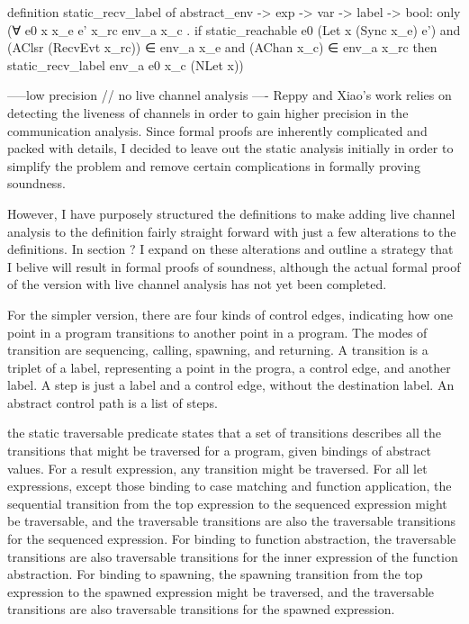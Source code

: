 definition static_recv_label of abstract_env -> exp -> var -> label -> bool:
only
(∀ e0 x x_e e' x_rc env_a x_c .
  if
    static_reachable e0 (Let x (Sync x_e) e') and
    (AClsr (RecvEvt x_rc)) ∈ env_a x_e and 
    (AChan x_c) ∈ env_a x_rc 
  then
    static_recv_label env_a e0 x_c (NLet x))


-----low precision // no live channel analysis ----
Reppy and Xiao's work relies on detecting the liveness of channels in order to gain higher
precision in the communication analysis.  Since formal proofs are inherently complicated and
packed with details, I decided to leave out the static analysis initially in order to simplify the
problem and remove certain complications in formally proving soundness.

However, I have purposely
structured the definitions to make adding live channel analysis to the definition fairly  
straight forward with just a few alterations to the definitions.  In section ? I expand on
these alterations and outline a strategy that I belive will result in formal proofs of soundness,
although the actual formal proof of the version with live channel analysis has not yet been
completed.  

For the simpler version, there are four kinds of control edges, indicating how one point in a
program transitions to another point in a program.  The modes of transition are sequencing,
calling, spawning, and returning. A transition is a triplet of a label, representing a point in
the progra, a control edge, and another label.  A step is just a label and a control edge,
without the destination label.  An abstract control path is a list of steps.  

the static traversable predicate states that a set of transitions describes all the transitions
that might be traversed for a program, given bindings of abstract values.  For a result
expression, any transition might be traversed.  For all let expressions, except those binding
to case matching and function application, the sequential transition from the top expression to
the sequenced expression might be traversable, and the traversable transitions are also the
traversable transitions for the sequenced expression.  For binding to function abstraction, the
traversable transitions are also traversable transitions for the inner expression of the
function abstraction.  For binding to spawning, the spawning transition from the top expression
to the spawned expression might be traversed, and the traversable transitions are also
traversable transitions for the spawned expression.

